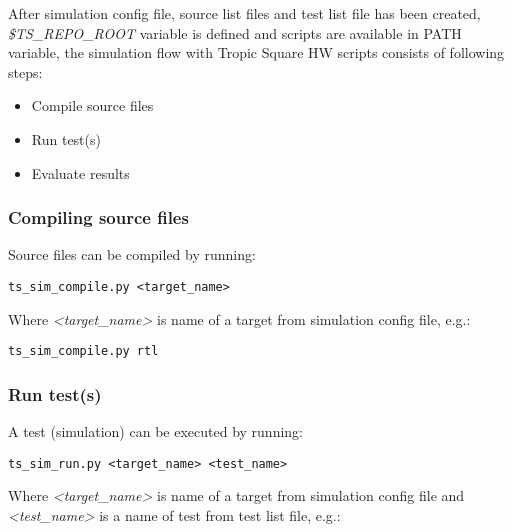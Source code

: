 \documentclass{tropic_design_spec}
\begin{document}
After simulation config file, source list files and test list file has been created,
\textit{\$TS_REPO_ROOT} variable is defined and scripts are available in PATH variable,
the simulation flow with Tropic Square HW scripts consists of following steps:
\begin{itemize}
    \item{Compile source files}
    \item{Run test(s)}
    \item{Evaluate results}
\end{itemize}


\subsubsection{Compiling source files}
\label{sec:compiling-source-files}

Source files can be compiled by running:

\begin{lstlisting}
ts_sim_compile.py <target_name>
\end{lstlisting}

Where \textit{<target_name>} is name of a target from simulation config file, e.g.:

\begin{lstlisting}
ts_sim_compile.py rtl
\end{lstlisting}



\subsubsection{Run test(s)}
\label{sec:run-tests}

A test (simulation) can be executed by running:

\begin{lstlisting}
ts_sim_run.py <target_name> <test_name>
\end{lstlisting}

Where \textit{<target_name>} is name of a target from simulation config file and
\textit{<test_name>} is a name of test from test list file, e.g.:
\end{document}
